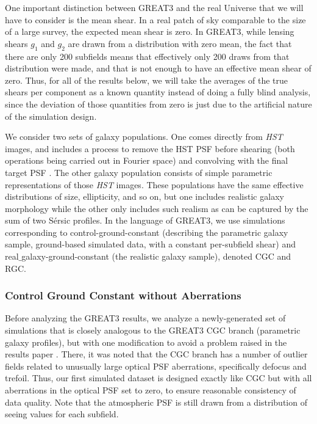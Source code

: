\documentclass[iop]{emulateapj}
\begin{document}
One important distinction between GREAT3 and the real Universe that we will have to consider is the
mean shear.  In a real patch of sky comparable to the size of a large survey, the expected mean
shear is zero.  In GREAT3, while lensing shears $g_1$ and $g_2$ are drawn from a distribution with
zero mean, the fact that there are only 200 subfields means that effectively only 200 draws from
that distribution were made, and that is not enough to have an effective mean shear of zero.  Thus,
for all of the results below, we will take the averages of the true shears per component as a known
quantity instead of doing a fully blind analysis, since the deviation of those quantities from zero
is just due to the artificial nature of the simulation design.

We consider two sets of galaxy populations.  One comes directly from {\it HST} images, and includes
a process to remove the HST PSF before shearing (both operations being carried out in Fourier space)
and convolving with the final target PSF \citep{2012MNRAS.420.1518M}.  The other galaxy population
consists of simple parametric representations of those {\it HST} images.  These populations have the
same effective distributions of size, ellipticity, and so on, but one includes realistic galaxy
morphology while the other only includes such realism as can be captured by the sum of two
S\'{e}rsic profiles.  In the language of GREAT3, we use simulations corresponding to
control-ground-constant (describing the parametric galaxy sample, ground-based simulated data, with
a constant per-subfield shear) and real$\_$galaxy-ground-constant (the realistic galaxy sample),
denoted CGC and RGC.


\subsubsection{Control Ground Constant without Aberrations}

Before analyzing the GREAT3 results, we analyze a newly-generated set of simulations that is closely
analogous to the GREAT3 CGC branch (parametric galaxy profiles), but with one modification to avoid
a problem raised in the results paper \citep{2015MNRAS.450.2963M}.  There, it was noted that the CGC
branch has a number of outlier fields related to unusually large optical PSF aberrations,
specifically defocus and trefoil.  Thus, our first simulated dataset is designed exactly like CGC
but with all aberrations in the optical PSF set to zero, to ensure reasonable consistency of data
quality.  Note that the atmospheric PSF is still drawn from a distribution of seeing values for each
subfield.
\end{document}
